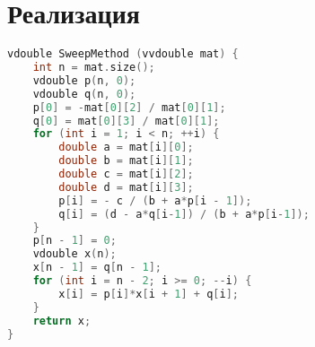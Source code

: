\section*{Реализация}

\begin{lstlisting}[language=C++]
vdouble SweepMethod (vvdouble mat) {
    int n = mat.size();
    vdouble p(n, 0);
    vdouble q(n, 0);
    p[0] = -mat[0][2] / mat[0][1];
    q[0] = mat[0][3] / mat[0][1];
    for (int i = 1; i < n; ++i) {
        double a = mat[i][0];
        double b = mat[i][1];
        double c = mat[i][2];
        double d = mat[i][3];
        p[i] = - c / (b + a*p[i - 1]);
        q[i] = (d - a*q[i-1]) / (b + a*p[i-1]);
    }
    p[n - 1] = 0;
    vdouble x(n);
    x[n - 1] = q[n - 1];
    for (int i = n - 2; i >= 0; --i) {
        x[i] = p[i]*x[i + 1] + q[i];
    }
    return x;
}
\end{lstlisting}

\pagebreak